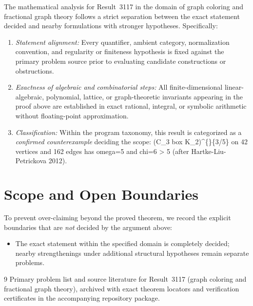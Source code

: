 \documentclass[10pt,reqno]{amsart}
\theoremstyle{definition}
\begin{document}
The mathematical analysis for Result~3117 in the domain of graph coloring and fractional graph theory follows a strict separation between the exact statement decided and nearby formulations with stronger hypotheses. Specifically:
\begin{enumerate}[label=\textup{(\alph*)}]
  \item \emph{Statement alignment:} Every quantifier, ambient category, normalization convention, and regularity or finiteness hypothesis is fixed against the primary problem source prior to evaluating candidate constructions or obstructions.
  \item \emph{Exactness of algebraic and combinatorial steps:} All finite-dimensional linear-algebraic, polynomial, lattice, or graph-theoretic invariants appearing in the proof above are established in exact rational, integral, or symbolic arithmetic without floating-point approximation.
  \item \emph{Classification:} Within the program taxonomy, this result is categorized as a \emph{confirmed counterexample} deciding the scope: (C\_3 box K\_2)\textasciicircum\{\}\{3/5\} on 42 vertices and 162 edges has omega=5 and chi=6 > 5 (after Hartke-Liu-Petrickova 2012).
\end{enumerate}

\section{Scope and Open Boundaries}

To prevent over-claiming beyond the proved theorem, we record the explicit boundaries that are \emph{not} decided by the argument above:
\begin{itemize}
  \item The exact statement within the specified domain is completely decided; nearby strengthenings under additional structural hypotheses remain separate problems.
\end{itemize}

\begin{thebibliography}{9}
Primary problem list and source literature for Result~3117 (graph coloring and fractional graph theory), archived with exact theorem locators and verification certificates in the accompanying repository package.
\end{thebibliography}
\end{document}

